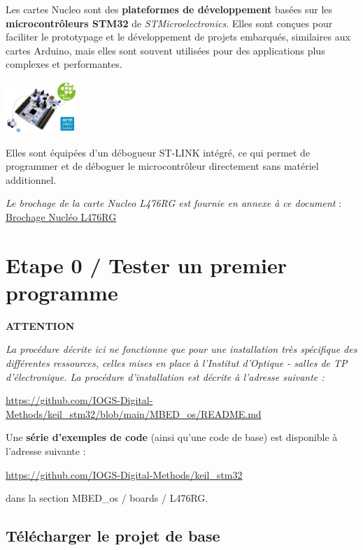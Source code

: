 \documentclass[a4paper,11pt,titlepage]{article} %
\begin{document}
Les cartes Nucleo sont des \textbf{plateformes de développement} basées sur les \textbf{microcontrôleurs STM32} de \textit{STMicroelectronics}. Elles sont conçues pour faciliter le prototypage et le développement de projets embarqués, similaires aux cartes Arduino, mais elles sont souvent utilisées pour des applications plus complexes et performantes.


\begin{center}
	\includegraphics[width=0.2\textwidth]{images/nucleo_board.jpg}
\end{center}

Elles sont équipées d'un débogueur ST-LINK intégré, ce qui permet de programmer et de déboguer le microcontrôleur directement sans matériel additionnel.

\textsl{Le brochage de la carte Nucleo L476RG est fournie en annexe à ce document} : \hyperref[doc:nucleo_pins_476RG]{Brochage Nucléo L476RG}


\cleardoublepage
\section{Etape 0 / Tester un premier programme}

{\large \textbf{ATTENTION}} 

\textit{La procédure décrite ici ne fonctionne que pour une installation très spécifique des différentes ressources, celles mises en place à l'Institut d'Optique - salles de TP d'électronique. La procédure d'installation est décrite à l'adresse suivante : }

\href{https://github.com/IOGS-Digital-Methods/keil_stm32/blob/main/MBED_os/README.md}{https://github.com/IOGS-Digital-Methods/keil\_stm32/blob/main/MBED\_os/README.md}

\bigskip


Une \textbf{série d'exemples de code} (ainsi qu'une code de base) est disponible à l'adresse suivante : 

\href{https://github.com/IOGS-Digital-Methods/keil_stm32}{https://github.com/IOGS-Digital-Methods/keil\_stm32}

dans la section MBED\_os / boards / L476RG.

\subsection{Télécharger le projet de base}
\end{document}
